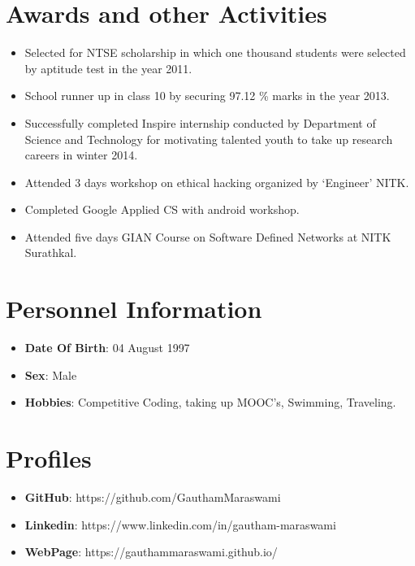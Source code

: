 \documentclass[letterpaper,11pt]{article}
\newcommand{\resumeItem}[2]{
  \item\small{
    \textbf{#1}{: #2 \vspace{-2pt}}
  }
}
\newcommand{\resumeSubItem}[2]{\resumeItem{#1}{#2}\vspace{-4pt}}
\newcommand{\resumeSubHeadingListStart}{\begin{itemize}[leftmargin=*]}
\newcommand{\resumeSubHeadingListEnd}{\end{itemize}}
\newcommand{\resumeItemListStart}{\begin{itemize}}
\newcommand{\resumeItemListEnd}{\end{itemize}\vspace{-5pt}}
\begin{document}
\section{Awards and other Activities}
\begin{itemize}
   \vspace{-1pt} \item Selected for NTSE scholarship in which one thousand students were selected by aptitude test in the year 2011.\vspace{-5pt}
  \vspace{-1pt}  \item School runner up in class 10 by securing 97.12 \% marks in the year 2013.\vspace{-5pt}
  \vspace{-1pt}  \item  Successfully completed Inspire internship conducted by Department of Science and Technology for motivating talented \vspace{-5pt}
youth to take up research careers in winter 2014.
  \vspace{-1pt}    \item Attended 3 days workshop on ethical hacking organized by ‘Engineer’ NITK. \vspace{-5pt}
  \vspace{-1pt}    \item Completed Google Applied CS with android workshop.\vspace{-5pt}
   \vspace{-1pt}   \item Attended five days GIAN Course on Software Defined Networks at NITK Surathkal.\vspace{-5pt}
\end{itemize}

\section{Personnel Information}
  \resumeItemListStart
    \resumeItem{Date Of Birth}
    {04 August 1997}
     \resumeItem{Sex}
    {Male}
         \resumeItem{Hobbies}
    {Competitive Coding, taking up MOOC’s, Swimming, Traveling.}
  \resumeItemListEnd
\section{Profiles}
  \resumeSubHeadingListStart
    \resumeSubItem{GitHub}
      {https://github.com/GauthamMaraswami}
    \resumeSubItem{Linkedin}
      {https://www.linkedin.com/in/gautham-maraswami}
        \resumeSubItem{WebPage}
      {https://gauthammaraswami.github.io/}
        \resumeSubHeadingListEnd
\end{document}
